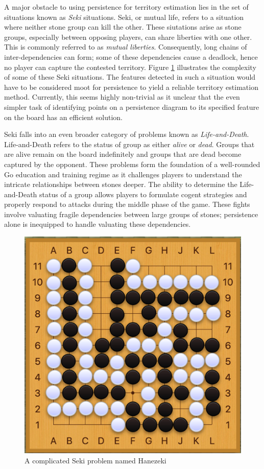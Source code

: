 \documentclass[11pt]{article}
\begin{document}
A major obstacle to using persistence for territory estimation lies in the set of situations known as \textit{Seki} situations. Seki, or mutual life, refers to a situation where neither stone group can kill the other. These siutations arise as stone groups, especially between opposing players, can share liberties with one other. This is commonly referred to as \textit{mutual liberties}. Consequently, long chains of inter-dependencies can form; some of these dependencies cause a deadlock, hence no player can capture the contested territory. Figure \ref{fig:seki1} illustrates the complexity of some of these Seki situations. The features detected in such a situation would have to be considered moot for persistence to yield a reliable territory estimation method. Currently, this seems highly non-trivial as it unclear that the even simpler task of identifying points on a persistence diagram to its specified feature on the board has an efficient solution.

Seki falls into an even broader category of problems known as \textit{Life-and-Death}. Life-and-Death refers to the status of group as either \textit{alive} or \textit{dead}. Groups that are alive remain on the board indefinitely and groups that are dead become captured by the opponent. These problems form the foundation of a well-rounded Go education and training regime as it challenges players to understand the intricate relationships between stones deeper. The ability to determine the Life-and-Death status of a group allows players to formulate cogent strategies and properly respond to attacks during the middle phase of the game. These fights involve valuating fragile dependencies between large groups of stones; persistence alone is inequipped to handle valuating these dependencies.

\begin{figure}[ht]
  \centering
  \includegraphics[scale=0.6]{seki1.png}
  \caption{A complicated Seki problem named Hanezeki}
  \label{fig:seki1}
\end{figure}
\end{document}
